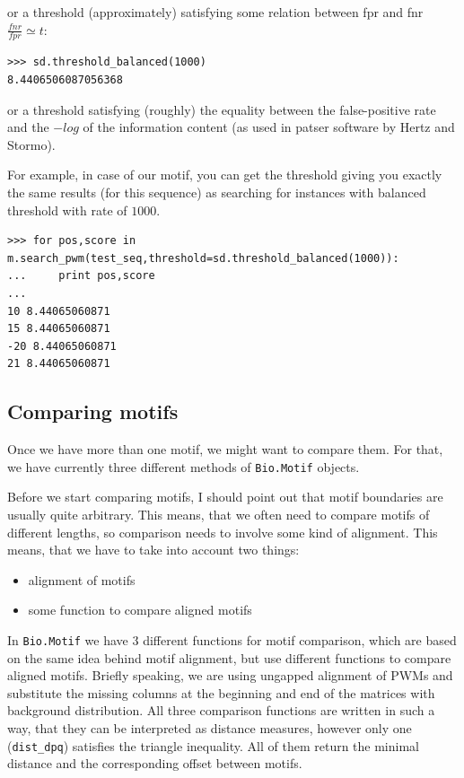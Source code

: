 \documentclass{report}
\begin{document}
or a threshold (approximately) satisfying some relation between fpr
and fnr $\frac{fnr}{fpr}\simeq t$:
\begin{verbatim}
>>> sd.threshold_balanced(1000)
8.4406506087056368
\end{verbatim}

or a threshold satisfying (roughly) the equality between the
false-positive rate and the $-log$ of the information content (as used
in patser software by Hertz and Stormo).

For example, in case of our motif, you can get the threshold giving
you exactly the same results (for this sequence) as searching for
instances with balanced threshold with rate of $1000$.
\begin{verbatim}
>>> for pos,score in m.search_pwm(test_seq,threshold=sd.threshold_balanced(1000)):
...     print pos,score
... 
10 8.44065060871
15 8.44065060871
-20 8.44065060871
21 8.44065060871
\end{verbatim}

\subsection{Comparing motifs}
\label{sec:comp}
Once we have more than one motif, we might want to compare them. For
that, we have currently three different methods of \verb|Bio.Motif|
objects.

Before we start comparing motifs, I should point out that motif
boundaries are usually quite arbitrary. This means, that we often need
to compare motifs of different lengths, so comparison needs to involve
some kind of alignment.  This means, that we have to take into account two things:
\begin{itemize}
\item alignment of motifs
\item some function to compare aligned motifs
\end{itemize}
In \verb|Bio.Motif| we have 3 different functions for motif
comparison, which are based on the same idea behind motif alignment,
but use different functions to compare aligned motifs. Briefly
speaking, we are using ungapped alignment of PWMs and substitute the
missing columns at the beginning and end of the matrices with
background distribution. All three comparison functions are written in
such a way, that they can be interpreted as distance measures, however
only one (\verb|dist_dpq|) satisfies the triangle inequality. All of
them return the minimal distance and the corresponding offset between
motifs.
\end{document}
